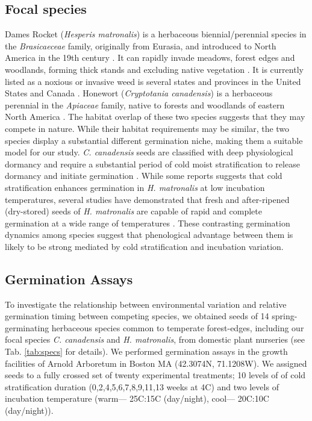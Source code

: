 \documentclass{article}\usepackage[]{graphicx}\usepackage[]{color}
\begin{document}
\subsection*{Focal species}
 Dames Rocket (\textit{Hesperis matronalis}) is a herbaceous biennial/perennial species in the \textit{Brasicaeceae} family, originally from Eurasia, and introduced to North America in the 19th century \citep{Francis:2009wz}. It  can rapidly invade  meadows, forest edges and woodlands, forming thick stands and excluding native vegetation \citep{Francis:2009wz}. It is currently listed as a noxious or invasive weed is several states and provinces in the United States and Canada \citep{Susko:2008ut}. Honewort (\textit{Cryptotania canadensis}) is a herbaceous perennial in the \textit{Apiaceae} family, native to forests and woodlands of eastern North America \citep{Hawkins:2007vb}. The  habitat overlap of these two species suggests that they may compete in nature. While their habitat requirements may be similar, the two species display a substantial different germination niche, making them a suitable model for our study. \textit{C. canadensis} seeds are classified with deep physiological dormancy and require a substantial period of cold moist stratification to release dormancy and initiate germination \citep{Baskin:1988um}. While some reports suggests that cold stratification enhances germination in \textit{H. matronalis} at low incubation temperatures, several studies have demonstrated that fresh and after-ripened (dry-stored) seeds of \textit{H. matronalis} are capable of rapid and complete germination at a wide range of temperatures \citep{Susko:2008ut}. These contrasting germination dynamics among species suggest that phenological advantage between them is likely to be strong mediated by cold stratification and incubation variation.  

\subsection*{Germination Assays}
To investigate the relationship between environmental variation and relative germination timing between competing species, we obtained seeds of 14 spring-germinating herbaceous species common to temperate forest-edges, including our focal species  \textit{C. canadensis} and \textit{H. matronalis}, from domestic plant nurseries (see Tab. \ref{tab:specs} for details). We performed germination assays in the growth facilities of Arnold Arboretum in Boston MA (42.3074\degree N, 71.1208\degree W). We assigned seeds to a fully crossed set of twenty experimental treatments; 10 levels of of cold stratification duration (0,2,4,5,6,7,8,9,11,13 weeks at 4\degree C) and two levels of incubation temperature (warm--- 25\degree C:15\degree C (day/night), cool--- 20\degree C:10\degree C (day/night)).
\end{document}

